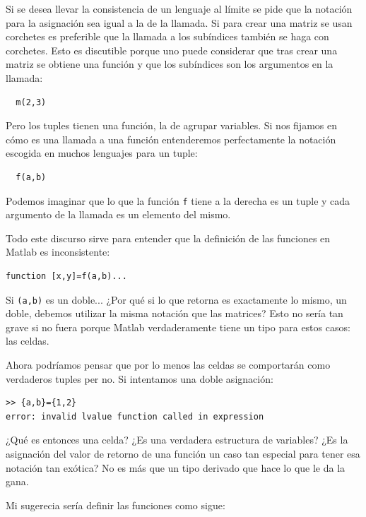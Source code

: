 Si se desea llevar la consistencia de un lenguaje al límite se pide
que la notación para la asignación sea igual a la de la llamada.  Si
para crear una matriz se usan corchetes es preferible que la llamada a
los subíndices también se haga con corchetes.  Esto es discutible
porque uno puede considerar que tras crear una matriz se obtiene una
función y que los subíndices son los argumentos en la llamada:

\begin{lstlisting}
  m(2,3)
\end{lstlisting}

Pero los tuples tienen una función, la de agrupar variables.  Si nos
fijamos en cómo es una llamada a una función entenderemos
perfectamente la notación escogida en muchos lenguajes para un tuple:

\begin{lstlisting}
  f(a,b)
\end{lstlisting}

Podemos imaginar que lo que la función \texttt{f} tiene a la derecha
es un tuple y cada argumento de la llamada es un elemento del mismo.

Todo este discurso sirve para entender que la definición de las
funciones en Matlab es inconsistente:

\begin{lstlisting}
function [x,y]=f(a,b)...
\end{lstlisting}

Si \texttt{(a,b)} es un doble... ¿Por qué si lo que retorna es
exactamente lo mismo, un doble, debemos utilizar la misma notación que
las matrices?  Esto no sería tan grave si no fuera porque Matlab
verdaderamente tiene un tipo para estos casos: las celdas.

Ahora podríamos pensar que por lo menos las celdas se comportarán como
verdaderos tuples per no.  Si intentamos una doble asignación:

\begin{lstlisting}
>> {a,b}={1,2}
error: invalid lvalue function called in expression
\end{lstlisting}

¿Qué es entonces una celda?  ¿Es una verdadera estructura de
variables?  ¿Es la asignación del valor de retorno de una función un
caso tan especial para tener esa notación tan exótica? No es más que
un tipo derivado que hace lo que le da la gana.

Mi sugerecia sería definir las funciones como sigue:

